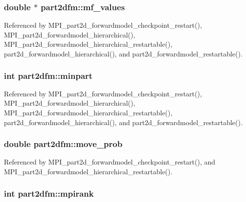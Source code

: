 \subsubsection[{\texorpdfstring{mf\+\_\+values}{mf_values}}]{\setlength{\rightskip}{0pt plus 5cm}double $\ast$ part2dfm\+::mf\+\_\+values}\hypertarget{structpart2dfm_a98e449e722a9d18c02102c74f5a02149}{}\label{structpart2dfm_a98e449e722a9d18c02102c74f5a02149}


Referenced by M\+P\+I\+\_\+part2d\+\_\+forwardmodel\+\_\+checkpoint\+\_\+restart(), M\+P\+I\+\_\+part2d\+\_\+forwardmodel\+\_\+hierarchical(), M\+P\+I\+\_\+part2d\+\_\+forwardmodel\+\_\+hierarchical\+\_\+restartable(), part2d\+\_\+forwardmodel\+\_\+hierarchical(), and part2d\+\_\+forwardmodel\+\_\+restartable().

\subsubsection[{\texorpdfstring{minpart}{minpart}}]{\setlength{\rightskip}{0pt plus 5cm}int part2dfm\+::minpart}\hypertarget{structpart2dfm_aaab4cc956caa7ed50e9ceca65c18ee74}{}\label{structpart2dfm_aaab4cc956caa7ed50e9ceca65c18ee74}


Referenced by M\+P\+I\+\_\+part2d\+\_\+forwardmodel\+\_\+checkpoint\+\_\+restart(), M\+P\+I\+\_\+part2d\+\_\+forwardmodel\+\_\+hierarchical(), M\+P\+I\+\_\+part2d\+\_\+forwardmodel\+\_\+hierarchical\+\_\+restartable(), part2d\+\_\+forwardmodel\+\_\+hierarchical(), and part2d\+\_\+forwardmodel\+\_\+restartable().

\subsubsection[{\texorpdfstring{move\+\_\+prob}{move_prob}}]{\setlength{\rightskip}{0pt plus 5cm}double part2dfm\+::move\+\_\+prob}\hypertarget{structpart2dfm_a45be675d3183f4a00bc9879c84891791}{}\label{structpart2dfm_a45be675d3183f4a00bc9879c84891791}


Referenced by M\+P\+I\+\_\+part2d\+\_\+forwardmodel\+\_\+checkpoint\+\_\+restart(), and M\+P\+I\+\_\+part2d\+\_\+forwardmodel\+\_\+hierarchical\+\_\+restartable().

\subsubsection[{\texorpdfstring{mpirank}{mpirank}}]{\setlength{\rightskip}{0pt plus 5cm}int part2dfm\+::mpirank}\hypertarget{structpart2dfm_aefe781530739011dadc002397e4258b8}{}\label{structpart2dfm_aefe781530739011dadc002397e4258b8}


